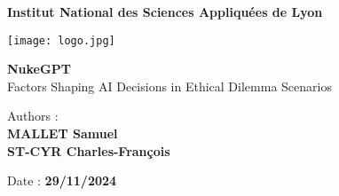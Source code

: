 \begin{center}
    \LARGE\textbf{Institut National des Sciences Appliquées de Lyon}

    \vspace{2em}

    \texttt{[image: logo.jpg]}

    \vfill

    \Huge\textbf{NukeGPT} \\
    \vspace{0.5em}
    \Large{Factors Shaping AI Decisions in Ethical Dilemma Scenarios}

    \vfill

    \Large{Authors :} \\
    \Large{\textbf{MALLET Samuel}} \\
    \Large{\textbf{ST-CYR Charles-François}} \\

    \vfill

    \Large{Date : \textbf{29/11/2024}}
\end{center}